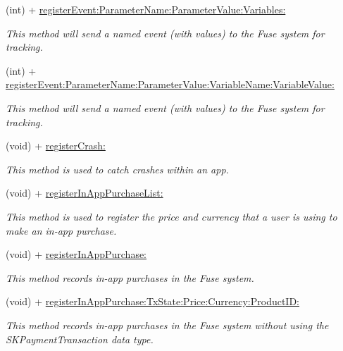 \begin{DoxyCompactItemize}
(int) + \hyperlink{interface_fuse_a_p_i_a837bfdf6d8a8dfa5f1693f3309734bf9}{register\+Event\+:\+Parameter\+Name\+:\+Parameter\+Value\+:\+Variables\+:}
\begin{DoxyCompactList}\small\item\em This method will send a named event (with values) to the Fuse system for tracking. \end{DoxyCompactList}\item 
(int) + \hyperlink{interface_fuse_a_p_i_a1ffe87df7aec0f432ef815a84e4750d8}{register\+Event\+:\+Parameter\+Name\+:\+Parameter\+Value\+:\+Variable\+Name\+:\+Variable\+Value\+:}
\begin{DoxyCompactList}\small\item\em This method will send a named event (with values) to the Fuse system for tracking. \end{DoxyCompactList}\item 
(void) + \hyperlink{interface_fuse_a_p_i_a9afd8c386a2b6664641da19fa64072c9}{register\+Crash\+:}
\begin{DoxyCompactList}\small\item\em This method is used to catch crashes within an app. \end{DoxyCompactList}\item 
(void) + \hyperlink{interface_fuse_a_p_i_ab1029e5beb592f22c1ba0deea9e7bd1c}{register\+In\+App\+Purchase\+List\+:}
\begin{DoxyCompactList}\small\item\em This method is used to register the price and currency that a user is using to make an in-\/app purchase. \end{DoxyCompactList}\item 
(void) + \hyperlink{interface_fuse_a_p_i_a2dd50722daab117889c396ff58fe7c27}{register\+In\+App\+Purchase\+:}
\begin{DoxyCompactList}\small\item\em This method records in-\/app purchases in the Fuse system. \end{DoxyCompactList}\item 
(void) + \hyperlink{interface_fuse_a_p_i_a8a1846c84fa16e45488e797dca4c7aaa}{register\+In\+App\+Purchase\+:\+Tx\+State\+:\+Price\+:\+Currency\+:\+Product\+I\+D\+:}
\begin{DoxyCompactList}\small\item\em This method records in-\/app purchases in the Fuse system without using the S\+K\+Payment\+Transaction data type. \end{DoxyCompactList}\item 

\end{DoxyCompactItemize}
